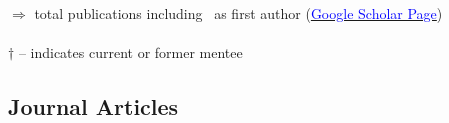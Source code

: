 \documentclass{article}[12pt]
\begin{document}
		\newcommand{\numFirstAuthor}{4}
		$\Rightarrow$  total publications including ~as first author (\href{https://scholar.google.com/citations?user=dOzcnYUAAAAJ&hl=en&oi=ao}{\textcolor{blue}{Google Scholar Page}})
		\\
		\\
		$\dagger$ -- indicates current or former mentee
		
		\subsection*{Journal Articles}
		
		
		
		
\end{document}
